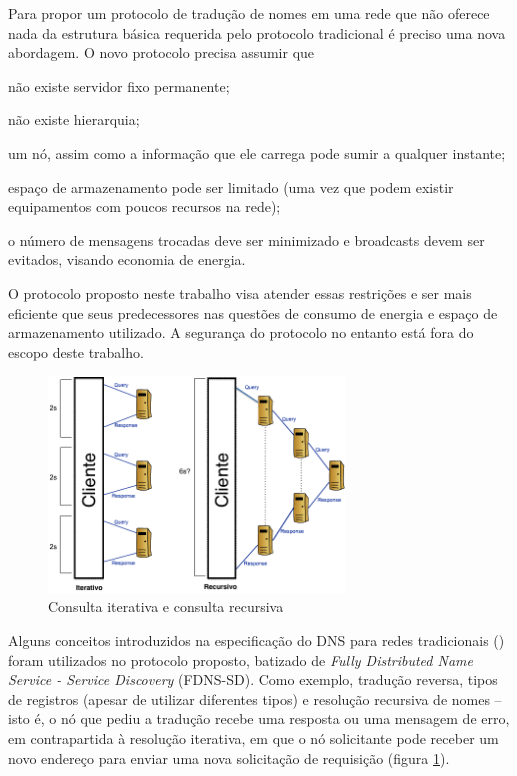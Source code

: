 Para propor um protocolo de tradução de nomes em uma rede que não oferece nada
da estrutura básica requerida pelo protocolo tradicional é preciso uma nova
abordagem. O novo protocolo precisa assumir que
\begin{inparaenum}[(i)]
    \item não existe servidor fixo permanente;
    \item não existe hierarquia;
    \item um nó, assim como a informação que ele carrega pode sumir a qualquer
    instante;
    \item espaço de armazenamento pode ser limitado (uma vez que podem existir
    equipamentos com poucos recursos na rede);
    \item o número de mensagens trocadas deve ser minimizado e broadcasts devem
    ser evitados, visando economia de energia.
\end{inparaenum}

O protocolo proposto neste trabalho visa atender essas restrições e ser mais
eficiente que seus predecessores \cite{mcdns} \cite{dnssd} \cite{mdns} nas questões
de consumo de energia e espaço de armazenamento utilizado. A segurança do protocolo
no entanto está fora do escopo deste trabalho.

\begin{figure}[h!]
    \centering
    \includegraphics[width=0.7\textwidth]{figures/datagram-timing}
    \caption{Consulta iterativa e consulta recursiva}
    \label{consultas}
\end{figure}

Alguns conceitos introduzidos na especificação do DNS para redes tradicionais
(\cite{rfc1035}) foram utilizados no protocolo proposto, batizado de \textit{Fully
Distributed Name Service - Service Discovery} (FDNS-SD). Como exemplo, tradução
reversa, tipos de registros (apesar de utilizar diferentes tipos) e resolução
recursiva de nomes -- isto é, o nó que pediu a tradução recebe uma resposta ou uma
mensagem de erro, em contrapartida à resolução iterativa, em que o nó solicitante
pode receber um novo endereço para enviar uma nova solicitação de requisição
(figura \ref{consultas}).

